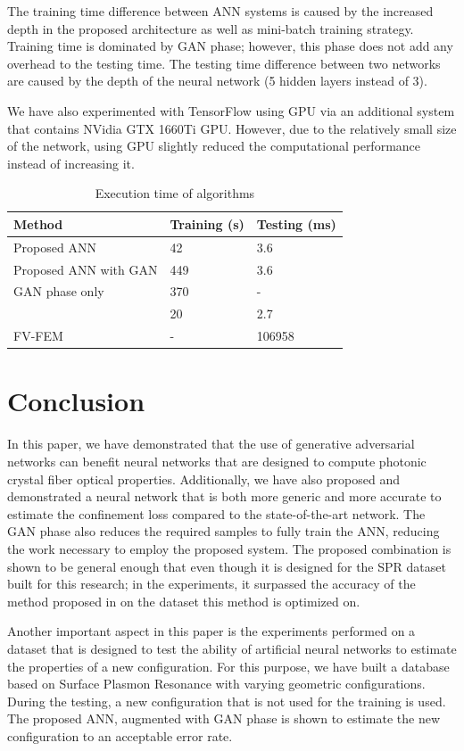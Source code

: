 \documentclass[10pt]{IEEEtran}
\begin{document}
The training time difference between ANN systems is caused by the increased depth in the proposed architecture as well as mini-batch training strategy. Training time is dominated by GAN phase; however, this phase does not add any overhead to the testing time. The testing time difference between two networks are caused by the depth of the neural network (5 hidden layers instead of 3). 

We have also experimented with TensorFlow using GPU via an additional system that contains NVidia GTX 1660Ti GPU. However, due to the relatively small size of the network, using GPU slightly reduced the computational performance instead of increasing it.

\begin{table}
\caption{Execution time of algorithms}
\begin{tabular}{l|l|l}
Method    			  &  Training (s) & Testing (ms) \\\hline
Proposed ANN 		  &  42 & 3.6 \\
Proposed ANN with GAN & 449 & 3.6 \\
GAN phase only        & 370 &  -  \\
\cite{paper0}		  &  20 & 2.7 \\
FV-FEM		   		  &  -  & 106958
\end{tabular}
\label{tbl:timing}
\end{table}

\section{Conclusion}
\label{sec:conc}

In this paper, we have demonstrated that the use of generative adversarial networks can benefit neural networks that are designed to compute photonic crystal fiber optical properties. Additionally, we have also proposed and demonstrated a neural network that is both more generic and more accurate to estimate the confinement loss compared to the state-of-the-art network. The GAN phase also reduces the required samples to fully train the ANN, reducing the work necessary to employ the proposed system. The proposed combination is shown to be general enough that even though it is designed for the SPR dataset built for this research; in the experiments, it surpassed the accuracy of the method proposed in \cite{paper0} on the dataset this method is optimized on.

Another important aspect in this paper is the experiments performed on a dataset that is designed to test the ability of artificial neural networks to estimate the properties of a new configuration. For this purpose, we have built a database based on Surface Plasmon Resonance with varying geometric configurations. During the testing, a new configuration that is not used for the training is used. The proposed ANN, augmented with GAN phase is shown to estimate the new configuration to an acceptable error rate.
\end{document}
